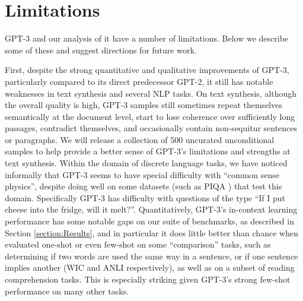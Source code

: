 \documentclass{article}
\begin{document}
\section{Limitations}
\label{section:Limitations}
GPT-3 and our analysis of it have a number of limitations.  Below we describe some of these and suggest directions for future work.

First, despite the strong quantitative and qualitative improvements of GPT-3, particularly compared to its direct predecessor GPT-2, it still has notable weaknesses in text synthesis and several NLP tasks.  On text synthesis, although the overall quality is high, GPT-3 samples still sometimes repeat themselves semantically at the document level, start to lose coherence over sufficiently long passages, contradict themselves, and occasionally contain non-sequitur sentences or paragraphs.  We will release a collection of 500 uncurated unconditional samples to help provide a better sense of GPT-3’s limitations and strengths at text synthesis. Within the domain of discrete language tasks, we have noticed informally that GPT-3 seems to have special difficulty with ``common sense physics'', despite doing well on some datasets (such as PIQA \cite{bisk2019piqa}) that test this domain.  Specifically GPT-3 has difficulty with questions of the type ``If I put cheese into the fridge, will it melt?''.  Quantitatively, GPT-3’s in-context learning performance has some notable gaps on our suite of benchmarks, as described in Section \ref{section:Results}, and in particular it does little better than chance when evaluated one-shot or even few-shot on some ``comparison'' tasks, such as determining if two words are used the same way in a sentence, or if one sentence implies another (WIC and ANLI respectively), as well as on a subset of reading comprehension tasks.  This is especially striking given GPT-3’s strong few-shot performance on many other tasks.
\end{document}
